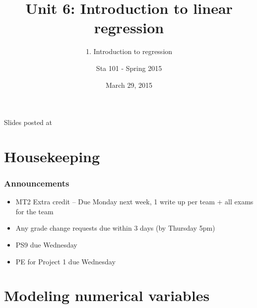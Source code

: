 \documentclass[slidestop,compress,mathserif,12pt,t,professionalfonts,xcolor=table]{beamer}
\title{Unit 6: Introduction to linear regression}
\subtitle{1. Introduction to regression}
\author{Sta 101 - Spring 2015}
\date{March 29, 2015}
\institute{Duke University, Department of Statistical Science}
\begin{document}


\begin{frame}[plain]

\titlepage
\vfill
{\scriptsize {} \hfill Slides posted at  \webLink{\CourseSite}{\CourseSite}}
\addtocounter{framenumber}{-1} 

\end{frame}


\section{Housekeeping}


\begin{frame}
\frametitle{Announcements}

\begin{itemize}

\item MT2 Extra credit -- Due Monday next week, 1 write up per team + all exams for the team

\item Any grade change requests due within 3 days (by Thursday 5pm)

\item PS9 due Wednesday

\item PE for Project 1 due Wednesday

\end{itemize}

\end{frame}


\section{Modeling numerical variables}

\end{document}
